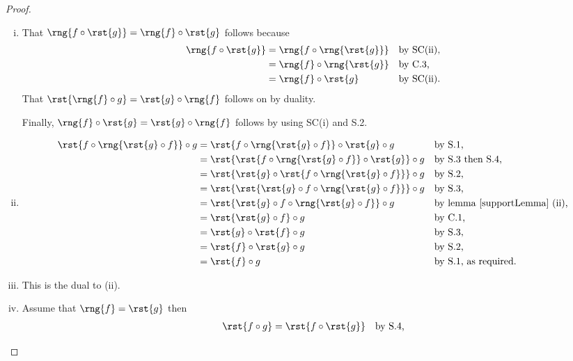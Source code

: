 \begin{proof}\leavevmode\par
\begin{enumerate}[(i)]
\item %
That $\rng{f \circ \rst{g}}
= \rng{f} \circ \rst{g}$ follows because
\begin{align*}
\rng{f \circ \rst{g}}
&= \rng{f \circ \rng{\rst{g}}}
&&\mbox{by SC(ii),}\\
&= \rng{f} \circ \rng{\rst{g}}
&&\mbox{by C.3,}\\
&=\rng{f} \circ \rst{g}
&&\mbox{by SC(ii).}
\end{align*}
That $\rst{\rng{f} \circ g}= \rst{g} \circ \rng{f}$
follows on by duality.

Finally, $\rng{f} \circ \rst{g} = \rst{g} \circ \rng{f}$ 
follows by using SC(i) and S.2.
\item %
\begin{align*}
\rst{f \circ \rng{\rst{g} \circ f}} \circ g
               &= \rst{f \circ \rng{\rst{g} \circ f}} \circ \rst{g} \circ g
               && \mbox{by S.1,}\\
               &= \rst{\rst{f \circ \rng{\rst{g} \circ f}} \circ \rst{g}} \circ g
               && \mbox{by S.3 then S.4,}\\
               &= \rst{\rst{g} \circ \rst{f \circ \rng{\rst{g} \circ f}}} \circ g
               && \mbox{by S.2,}\\
               &= \rst{\rst{\rst{g} \circ f \circ \rng{\rst{g} \circ f}}} \circ g
               && \mbox{by S.3,}\\
               &= \rst{\rst{g} \circ f \circ \rng{\rst{g} \circ f}} \circ g
               && \mbox{by lemma \ref{supportLemma} (ii),}\\
               &= \rst{\rst{g} \circ f } \circ g
               && \mbox{by C.1,}\\
               &= \rst{g} \circ \rst{f}  \circ g
               && \mbox{by S.3,}\\
               &=  \rst{f}  \circ \rst{g}  \circ g
               && \mbox{by S.2,}\\
               &= \rst{f}  \circ g
               && \mbox{by S.1, as required.}
\end{align*}
\item %
This is the dual to (ii).
\item %
Assume that $\rng{f} = \rst{g}$ then
\begin{align*}
\rst{f \circ g} &= \rst{f \circ \rst{g}} 
                             && \mbox{by S.4,} \\

\end{align*}
\end{enumerate}
\end{proof}
